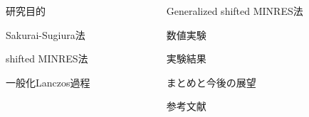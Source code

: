 \documentclass[final,dvipdfmx]{beamer}
\begin{document}
\begin{frame}[t]{}


\begin{columns}[T]

  \begin{column}{.49\linewidth}
    \begin{block}{研究目的}
      
    \end{block}
    \begin{block}{Sakurai-Sugiura法}
      
    \end{block}
    \begin{block}{shifted MINRES法}
      
    \end{block}
    \begin{block}{一般化Lanczos過程}
      
    \end{block}
  \end{column}

  \begin{column}{.49\linewidth}
    \begin{block}{Generalized shifted MINRES法}
      
    \end{block}
    \begin{block}{数値実験}
      
    \end{block}
    \begin{block}{実験結果}
      
    \end{block}
    \begin{block}{まとめと今後の展望}
      
    \end{block}
    \begin{block}{参考文献}
      
    \end{block}
  \end{column}

\end{columns}

\end{frame}
\end{document}
